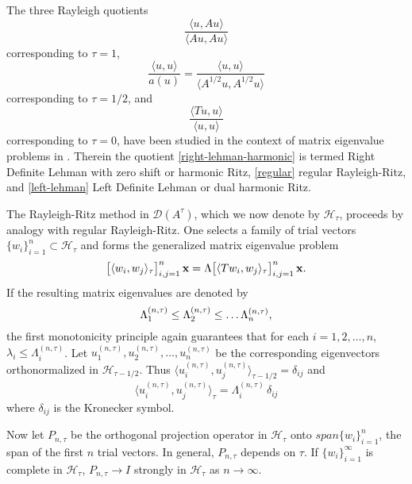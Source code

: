 \documentclass[final]{siamltex}
\numberwithin{equation}{section}
\begin{document}
The three Rayleigh quotients
\begin{equation} \label{right-lehman-harmonic}
\displaystyle{ \frac{ \langle u,  A u \rangle}{\langle A u, A u
\rangle} }
\end{equation}
corresponding to $\tau=1$,
\begin{equation} \label{regular}
\displaystyle{ \frac{ \langle u,  u \rangle}{a(u)}  = \frac{
\langle u, u \rangle}{\langle A^{1/2} u, A^{1/2} u \rangle} }
\end{equation}
corresponding to $\tau =1/2$, and
\begin{equation} \label{left-lehman}
\displaystyle{ \frac{ \langle T u, u \rangle}{\langle u, u
\rangle} }
\end{equation}
corresponding to $\tau=0$, have been studied in the context of matrix eigenvalue problems in \cite{Beattie-ETNA}. Therein the quotient
\eqref{right-lehman-harmonic} is termed Right Definite Lehman with
zero shift or harmonic Ritz, \eqref{regular} regular Rayleigh-Ritz, and \eqref{left-lehman} Left Definite Lehman or dual harmonic Ritz.

The Rayleigh-Ritz method in $\mathcal{D}(A^{\tau})$, which we now denote by $\mathcal{H}_{\tau}$, proceeds by analogy with regular Rayleigh-Ritz. One selects a family of trial vectors $\{w_i\}_{i=1}^n \subset \mathcal{H}_{\tau}$ and forms the generalized matrix eigenvalue problem
\begin{equation} \notag
\big[\langle w_i, w_j\rangle_{\tau} \big]_{i,j=1}^n \, {\bf x} =\Lambda \big[\langle T w_i, w_j \rangle_{\tau} \big]_{i,j=1}^n \, {\bf x}.
\end{equation}
If the resulting matrix eigenvalues are denoted by
\begin{equation} \notag
\Lambda_1^{(n, \tau)} \le
\Lambda_2^{(n, \tau)} \le \ldots
\Lambda_n^{(n, \tau)},
\end{equation}
the first monotonicity principle again guarantees that for each $i=1, 2, \ldots, n$, $\lambda_i\le \Lambda_i^{(n, \tau)}$. Let
$u_1^{(n, \tau)}, u_2^{(n, \tau)}, \ldots, u_n^{(n, \tau)}$ be the corresponding eigenvectors orthonormalized in $\mathcal{H}_{\tau-1/2}$. Thus $\langle u_i^{(n, \tau)}, u_j^{(n, \tau)}\rangle_{\tau-1/2}=\delta_{ij}$ and
\[\langle u_i^{(n, \tau)}, u_j^{(n, \tau)}\rangle_{\tau}=\Lambda_i^{(n, \tau)} \, \delta_{ij}\]
where $\delta_{ij}$ is the Kronecker symbol.

Now let $P_{n, \tau}$ be the orthogonal projection operator in $\mathcal{H}_{\tau}$ onto $span \{ w_i \}_{i=1}^n$, the span of the first $n$ trial vectors. In general, $P_{n, \tau}$ depends on $\tau$. If $\{ w_i \}_{i=1}^{\infty}$ is complete in $\mathcal{H}_{\tau}$, $P_{n, \tau} \to I$ strongly in $\mathcal{H}_{\tau}$ as $n\to \infty$.
\end{document}
